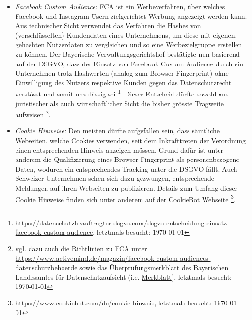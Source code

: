 \documentclass[a4paper,pointlessnumbers]{scrreprt}
\begin{document}
\begin{itemize}[itemsep=0pt]
\item \textit{Facebook Custom Audience:} FCA ist ein Werbeverfahren, über welches Facebook und Instagram Usern zielgerichtet Werbung angezeigt werden kann. Aus technischer Sicht verwendet das Verfahren die Hashes von (verschlüsselten) Kundendaten eines Unternehmens, um diese mit eigenen, gehashten Nutzerdaten zu vergleichen und so eine Werbezielgruppe erstellen zu können. Der Bayerische Verwaltungsgerichtshof bestätigte nun basierend auf der DSGVO, dass der Einsatz von Facebook Custom Audience durch ein Unternehmen trotz Hashwerten (analog zum Browser Fingerprint) ohne Einwilligung des Nutzers respektive Kunden gegen das Datenschutzrecht verstösst und somit unzulässig sei \footnote{\href{https://datenschutzbeauftragter-dsgvo.com/dsgvo-entscheidung-einsatz-facebook-custom-audience}{https://datenschutzbeauftragter-dsgvo.com/dsgvo-entscheidung-einsatz-facebook-custom-audience}, letztmals besucht: \today}. Dieser Entscheid dürfte sowohl aus juristischer als auch wirtschaftlicher Sicht die bisher grösste Tragweite aufweisen \footnote{vgl. dazu auch die Richtlinien zu FCA unter \href{https://www.activemind.de/magazin/facebook-custom-audiences-datenschutzbehoerde}{https://www.activemind.de/magazin/facebook-custom-audiences-datenschutzbehoerde} sowie das Überprüfungsmerkblatt des Bayerischen Landesamtes für Datenschutzaufsicht (i.e. \href{https://www.lda.bayern.de/media/pm2018\_18\_anhang.pdf}{Merkblatt}), letztmals besucht: \today}.
\item \textit{Cookie Hinweise:} Den meisten dürfte aufgefallen sein, dass sämtliche Webseiten, welche Cookies verwenden, seit dem Inkrafttreten der Verordnung einen entsprechenden Hinweis anzeigen müssen. Grund dafür ist unter anderem die Qualifizierung eines Browser Fingerprint als personenbezogene Daten, wodurch ein entsprechendes Tracking unter die DSGVO fällt. Auch Schweizer Unternehmen sehen sich dazu gezwungen, entsprechende Meldungen auf ihren Webseiten zu publizieren. Details zum Umfang dieser Cookie Hinweise finden sich unter anderem auf der CookieBot Webseite \footnote{\href{https://www.cookiebot.com/de/cookie-hinweis/?gclid=EAIaIQobChMIhL6m-o-l4gIVyasYCh1RdgMCEAAYASAAEgJ1QPD\_BwE}{https://www.cookiebot.com/de/cookie-hinweis}, letztmals besucht: \today}.
\end{itemize}
\end{document}
